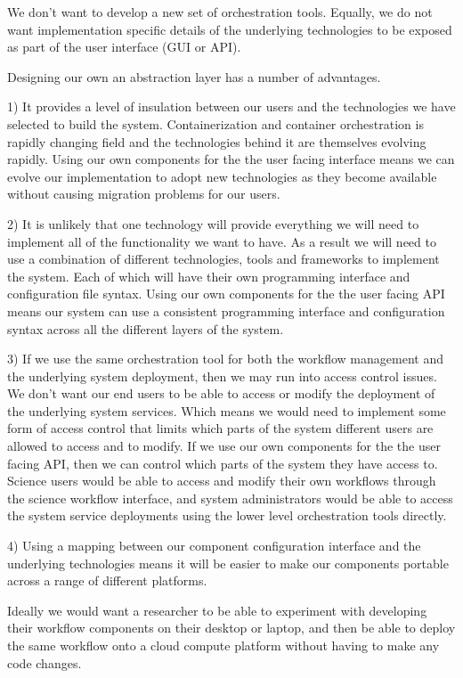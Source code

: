 \documentclass{article}
\begin{document}
We don't want to develop a new set of orchestration tools. Equally, we do not want implementation specific details of the underlying technologies to be exposed as part of the user interface (GUI or API).

Designing our own an abstraction layer has a number of advantages.

1) It provides a level of insulation between our users and the technologies we have selected to build the system. Containerization and container orchestration is rapidly changing field and the technologies behind it are themselves evolving rapidly.
Using our own components for the the user facing interface means we can evolve our implementation to adopt new technologies as they become available without causing migration problems for our users.

2) It is unlikely that one technology will provide everything we will need to implement all of the functionality we want to have. As a result we will need to use a combination of different technologies, tools and frameworks to implement the system. Each of which will have their own programming interface and configuration file syntax.
Using our own components for the the user facing API means our system can use a consistent programming interface and configuration syntax across all the different layers of the system.

3) If we use the same orchestration tool for both the workflow management and the underlying system deployment, then we may run into access control issues.
We don't want our end users to be able to access or modify the deployment of the underlying system services. Which means we would need to implement some form of access control that limits which parts of the system different users are allowed to access and to modify.
If we use our own components for the the user facing API, then we can control which parts of the system they have access to. Science users would be able to access and modify their own workflows through the science workflow interface, and system administrators would be able to access the system service deployments using the lower level orchestration tools directly.

4) Using a mapping between our component configuration interface and the underlying technologies means it will be easier to make our components portable across a range of different platforms.

Ideally we would want a researcher to be able to experiment with developing their workflow components on their desktop or laptop, and then be able to deploy the same workflow onto a cloud compute platform without having to make any code changes.
\end{document}
